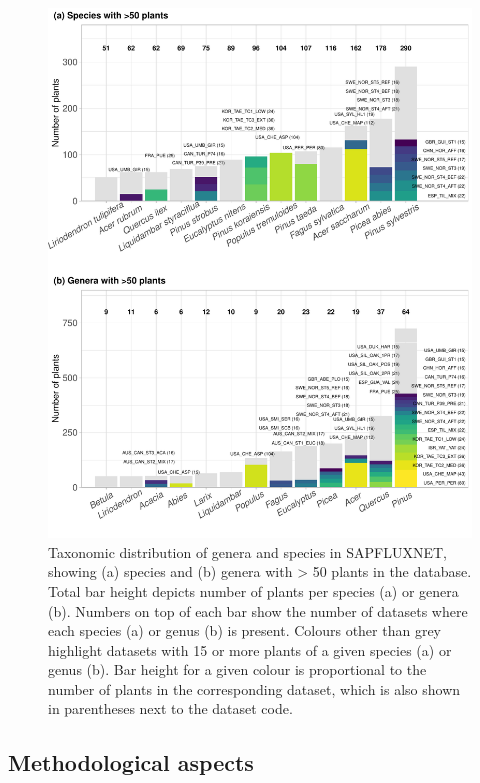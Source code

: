 \documentclass[11pt,twoside]{reedthesis}
\begin{document}
\begin{figure}[H]

{\centering \includegraphics[width=1\linewidth]{figure/CH3/Figure3} 

}

\caption[Taxonomic distribution of genera and species in SAPFLUXNET.]{Taxonomic distribution of genera and species in SAPFLUXNET, showing (a) species and (b) genera with > 50 plants in the database. Total bar height depicts number of plants per species (a) or genera (b). Numbers on top of each bar show the number of datasets where each species (a) or genus (b) is present. Colours other than grey highlight datasets with 15 or more plants of a given species (a) or genus (b). Bar height for a given colour is proportional to the number of plants in the corresponding dataset, which is also shown in parentheses next to the dataset code.}\label{fig:Ch2plot3}
\end{figure}
\subsection{Methodological aspects}\label{methodological-aspects}
\end{document}
